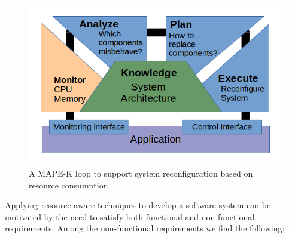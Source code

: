 \begin{figure}[!h]
\centering
\includegraphics[scale=0.65]{./chapter1/fig/mape-k.png}
\caption{A MAPE-K loop to support system reconfiguration based on resource consumption} \label{fig:resource-aware-vs-autonomic-computing}
\end{figure}

Applying resource-aware techniques to develop a software system can be motivated by the need to satisfy both functional and non-functional requirements.
Among the non-functional requirements we find the following:

